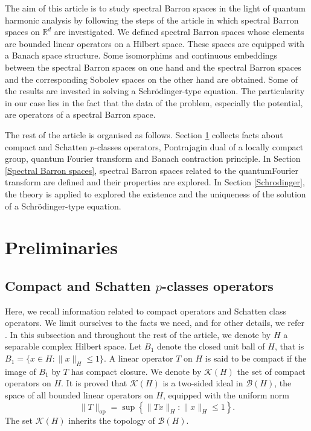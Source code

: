 \documentclass[11pt,a4paper]{amsart}
\begin{document}
 The aim of this article is to study spectral  Barron spaces in the light of quantum harmonic analysis by following the steps of the article \cite{Choulli} in which  spectral Barron spaces on $\mathbb{R}^d$ are investigated. We defined spectral Barron spaces whose elements are bounded linear operators on a Hilbert space. These spaces are equipped with a Banach space structure. Some isomorphims and continuous embeddings between the  spectral Barron spaces on one hand and  the  spectral Barron spaces and the corresponding Sobolev spaces on the other hand  are obtained. Some of the results are invested in solving a Schr\"odinger-type equation.  The particularity in our case lies in the fact that the data of the problem, especially the potential,  are operators of a spectral Barron space.
 
 The rest of the article is organised as follows.  Section \ref{Preliminaries} collects facts about  compact and Schatten $p$-classes operators, Pontrajagin dual of a locally compact group,  quantum Fourier transform and  Banach contraction principle.  In Section \ref{Spectral Barron spaces},    spectral Barron spaces related to the quantumFourier transform are defined and their properties are explored. In Section \ref{Schrodinger}, the theory is applied to explored the existence and the  uniqueness  of the solution of a Schr\"odinger-type equation. 

 
 
 
 
\section{Preliminaries}\label{Preliminaries}

\subsection{Compact and Schatten $p$-classes operators}
Here, we recall information related to compact operators and Schatten class operators. We limit ourselves to the facts we need, and for other details, we refer \cite{Dell, Zhu}.
 In this subsection and throughout the rest of the article, we denote by $H$  a separable complex Hilbert space. Let $B_1$  denote the closed unit ball of $H$, that is $B_1=\{x\in H : \|x\|_H\leq 1\}$. A linear operator $T$ on $H$ is said to be compact if the image  of $B_1$ by $T$ has compact closure. We denote by $\mathcal{K}(H)$ the set of compact operators on $H$. 
It is proved that $\mathcal{K}(H)$ is a two-sided ideal in $\mathcal{B}(H)$, the space of all bounded linear  operators on $H$, equipped with the uniform norm
\begin{equation}
\|T\|_{\mbox{op}}=\sup\left\{\|Tx\|_H : \|x\|_H\leq 1 \right\}.
\end{equation} 
The set $\mathcal{K}(H)$ inherits the topology of $\mathcal{B}(H)$.
\end{document}
